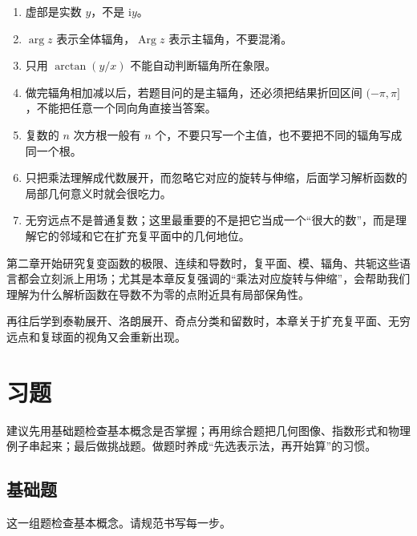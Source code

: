 \begin{jinshi}[本章最容易混淆的地方]
\begin{enumerate}
    \item 虚部是实数 $y$，不是 $\mathrm{i}y$。
    \item $\arg z$ 表示全体辐角，$\operatorname{Arg}z$ 表示主辐角，不要混淆。
    \item 只用 $\arctan(y/x)$ 不能自动判断辐角所在象限。
    \item 做完辐角相加减以后，若题目问的是主辐角，还必须把结果折回区间 $(-\pi,\pi]$，不能把任意一个同向角直接当答案。
    \item 复数的 $n$ 次方根一般有 $n$ 个，不要只写一个主值，也不要把不同的辐角写成同一个根。
    \item 只把乘法理解成代数展开，而忽略它对应的旋转与伸缩，后面学习解析函数的局部几何意义时就会很吃力。
    \item 无穷远点不是普通复数；这里最重要的不是把它当成一个``很大的数''，而是理解它的邻域和它在扩充复平面中的几何地位。
\end{enumerate}
\end{jinshi}

\begin{tishi}[本章与后续内容的联系]
第二章开始研究复变函数的极限、连续和导数时，复平面、模、辐角、共轭这些语言都会立刻派上用场；尤其是本章反复强调的``乘法对应旋转与伸缩''，会帮助我们理解为什么解析函数在导数不为零的点附近具有局部保角性。

再往后学到泰勒展开、洛朗展开、奇点分类和留数时，本章关于扩充复平面、无穷远点和复球面的视角又会重新出现。
\end{tishi}

\section{习题}

\begin{tishi}[习题练习建议]
建议先用基础题检查基本概念是否掌握；再用综合题把几何图像、指数形式和物理例子串起来；最后做挑战题。做题时养成``先选表示法，再开始算''的习惯。
\end{tishi}

\subsection{基础题}

这一组题检查基本概念。请规范书写每一步。

